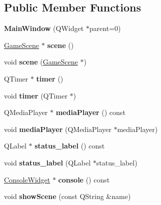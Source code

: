 \subsection*{Public Member Functions}
\begin{DoxyCompactItemize}
\item 
\mbox{\label{class_main_window_a8b244be8b7b7db1b08de2a2acb9409db}} 
{\bfseries Main\+Window} (Q\+Widget $\ast$parent=0)
\item 
\mbox{\label{class_main_window_a8876be87b41337f2ccf8ef1fc6b4a9c8}} 
\hyperlink{class_game_scene}{Game\+Scene} $\ast$ {\bfseries scene} ()
\item 
\mbox{\label{class_main_window_a0eae38634f26f1bd23717174cd751523}} 
void {\bfseries scene} (\hyperlink{class_game_scene}{Game\+Scene} $\ast$)
\item 
\mbox{\label{class_main_window_ae9adbd9ad74d836628ff2950d503e397}} 
Q\+Timer $\ast$ {\bfseries timer} ()
\item 
\mbox{\label{class_main_window_a5ac9feeab611a5aafaa0191df82b4bf1}} 
void {\bfseries timer} (Q\+Timer $\ast$)
\item 
\mbox{\label{class_main_window_a1ee03f14689d63b79b48dd31c7f2c572}} 
Q\+Media\+Player $\ast$ {\bfseries media\+Player} () const
\item 
\mbox{\label{class_main_window_a04a7066651d54008b870b722b310da41}} 
void {\bfseries media\+Player} (Q\+Media\+Player $\ast$media\+Player)
\item 
\mbox{\label{class_main_window_adb747cc217a5a2a077af79fe72c278cf}} 
Q\+Label $\ast$ {\bfseries status\+\_\+label} () const
\item 
\mbox{\label{class_main_window_a685d2e26a50d151d9ebd4fb0cc9f8aca}} 
void {\bfseries status\+\_\+label} (Q\+Label $\ast$status\+\_\+label)
\item 
\mbox{\label{class_main_window_a5f010205227b4aaf83f3874d5fbb08a0}} 
\hyperlink{class_console_widget}{Console\+Widget} $\ast$ {\bfseries console} () const
\item 
\mbox{\label{class_main_window_a1fabca5cc1f1f4f6a4a1cecec17aa822}} 
void {\bfseries show\+Scene} (const Q\+String \&name)
\end{DoxyCompactItemize}
